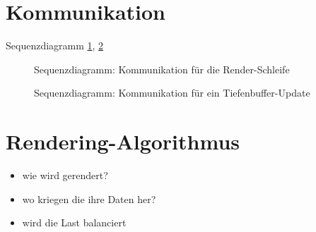 \section{Kommunikation}
\label{sec:impl:kommunikation}
%
Sequenzdiagramm \ref{fig:impl:seqdiagrender}, \ref{fig:impl:seqdiagdepth}

\begin{figure}

  \caption{Sequenzdiagramm: Kommunikation für die Render-Schleife}
  \label{fig:impl:seqdiagrender}
\end{figure}

\begin{figure}

  \caption{Sequenzdiagramm: Kommunikation für ein Tiefenbuffer-Update}
  \label{fig:impl:seqdiagdepth}
\end{figure}

\section{Rendering-Algorithmus}
\label{sec:impl:renderalgo}
%
\begin{itemize}
 \item wie wird gerendert?
 \item wo kriegen die ihre Daten her?
 \item wird die Last balanciert
\end{itemize}


%
%
